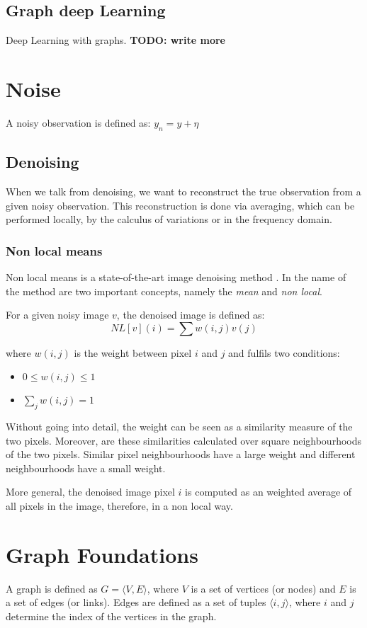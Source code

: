 \subsection{Graph deep Learning}
Deep Learning with graphs.
\textbf{TODO: write more}


\section{Noise}
A noisy observation is defined as:
$y_n = y + \eta$

\subsection{Denoising}
When we talk from denoising, we want to reconstruct the true observation 
from a given noisy observation. This reconstruction is done via averaging, which can be performed
locally, by the calculus of variations or in the frequency domain.

\subsubsection{Non local means}
Non local means is a state-of-the-art image denoising method \cite{noneLocalMean}.
In the name of the method are two important concepts, namely the \textit{mean}
and \textit{non local}.

For a given noisy image $v$, the denoised image is defined as:
\begin{equation}
    NL[v](i) = \sum{w(i,j)v(j)}
\end{equation}

where $w(i,j)$ is the weight between pixel $i$ and $j$ and fulfils two conditions:
\begin{itemize}
    \item $0 \le w(i,j) \le 1$
    \item $\sum_j{w(i,j) = 1}$
\end{itemize}

Without going into detail, the weight can be seen as a similarity measure of the two pixels.
Moreover, are these similarities calculated over square neighbourhoods of the two pixels.
Similar pixel neighbourhoods have a large weight and different neighbourhoods have a small weight.

More general, the denoised image pixel $i$ is computed 
as an weighted average of all pixels in the image, therefore, in a non local way.

\section{Graph Foundations}
A graph is defined as  $G = \langle V,E \rangle$, where $V$ is a set of 
vertices (or nodes) and $E$ is a set of edges (or links). Edges are 
defined as a set of tuples $\langle i,j \rangle$, where $i$ and $j$ determine the 
index of the vertices in the graph.

